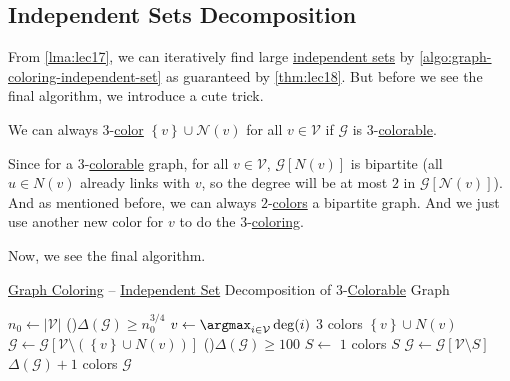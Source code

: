 \subsection{Independent Sets Decomposition}
From \autoref{lma:lec17}, we can iteratively find large \hyperref[def:independent-set]{independent sets} by \autoref{algo:graph-coloring-independent-set} as guaranteed by \autoref{thm:lec18}. But before we see the final algorithm, we introduce a cute trick.

\begin{remark}\label{rmk:Wigderson-trick}
	We can always \(3\)-\hyperref[def:coloring]{color} \(\left\{ v \right\} \cup \mathcal{N} (v)\) for all \(v\in \mathcal{V} \) if \(\mathcal{G} \) is \(3\)-\hyperref[def:coloring]{colorable}.
\end{remark}
\begin{explanation}
	Since for a \(3\)-\hyperref[def:coloring]{colorable} graph, for all \(v\in \mathcal{V} \), \(\mathcal{G} [N(v)]\) is bipartite (all \(u\in N(v)\) already links with \(v\), so the degree will be at most \(2\) in \(\mathcal{G} [\mathcal{N} (v)]\)). And as mentioned before, we can always \(2\)-\hyperref[def:coloring]{colors} a bipartite graph. And we just use another new color for \(v\) to do the \(3\)-\hyperref[def:coloring]{coloring}.
\end{explanation}

Now, we see the final algorithm.

\begin{algorithm}[H]\label{algo:graph-coloring}
	\DontPrintSemicolon{}
	\caption{\hyperref[prb:graph-coloring]{Graph Coloring} -- \hyperref[def:independent-set]{Independent Set} Decomposition of \(3\)-\hyperref[def:coloring]{Colorable} Graph}
	\BlankLine
	\(n_0\gets \left\vert \mathcal{V}  \right\vert \)\;
	\;
	\While(\label{algo:graph-coloring-phase-1}){\(\Delta (\mathcal{G} ) \geq n_0 ^{3 / 4}\)}{
	\(v\gets \argmax_{i\in \mathcal{V} } \deg(i)\)\;
	\(3\) colors \(\left\{ v \right\} \cup N(v)\)
	\(\mathcal{G} \gets \mathcal{G} [\mathcal{V} \setminus (\left\{ v \right\} \cup N(v))]\)\;
	}
	\;
	\While(\label{algo:graph-coloring-phase-2}){\(\Delta (\mathcal{G} ) \geq 100\)}{
		\(S\gets\)
		\(1\) colors \(S\)\;
		\(\mathcal{G} \gets \mathcal{G} [\mathcal{V} \setminus S]\)\;
	}
	\;
	\(\Delta (\mathcal{G} ) + 1\) colors \(\mathcal{G} \)\label{algo:graph-coloring-phase-3}
	\;
\end{algorithm}

